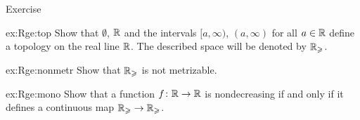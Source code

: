 \begin{thm}{Exercise}\label{ex:Rge}

\begin{subthm}{ex:Rge:top}
Show that $\emptyset$, $\mathbb{R}$ and the intervals $[a,\infty)$, $(a,\infty)$ for all $a\in\mathbb{R}$ define a topology on the real line $\mathbb{R}$.
The  described space will be denoted by $\mathbb{R}_\geqslant$.
\end{subthm}

\begin{subthm}{ex:Rge:nonmetr}
Show that $\mathbb{R}_\geqslant$ is not metrizable.
\end{subthm}

\begin{subthm}{ex:Rge:mono}
Show that a function $f\colon\mathbb{R}\to\mathbb{R}$ is nondecreasing if and only if it defines a continuous map $\mathbb{R}_\geqslant\to \mathbb{R}_\geqslant$.
\end{subthm}

\end{thm}




